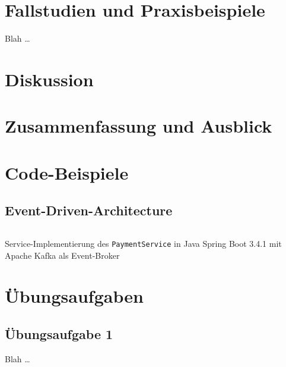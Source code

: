 \documentclass[acmtog]{acmart}
\begin{document}
\section{Fallstudien und Praxisbeispiele}
Blah \ldots

\section{Diskussion}

\section{Zusammenfassung und Ausblick}









\appendix

\section{Code-Beispiele}

\subsection{Event-Driven-Architecture}
\label{app:code:eda:paymentservice}
\begin{listing}[H]
  \tiny
  \inputminted[linenos=true]{java}{code/eda/PaymentService.java}
  \caption{Service-Implementierung des \texttt{PaymentService} in Java Spring Boot 3.4.1 mit Apache Kafka als Event-Broker}
  \label{listing:semigroup}
\end{listing}

\section{Übungsaufgaben}
\subsection{Übungsaufgabe 1 }
Blah \ldots
\end{document}
